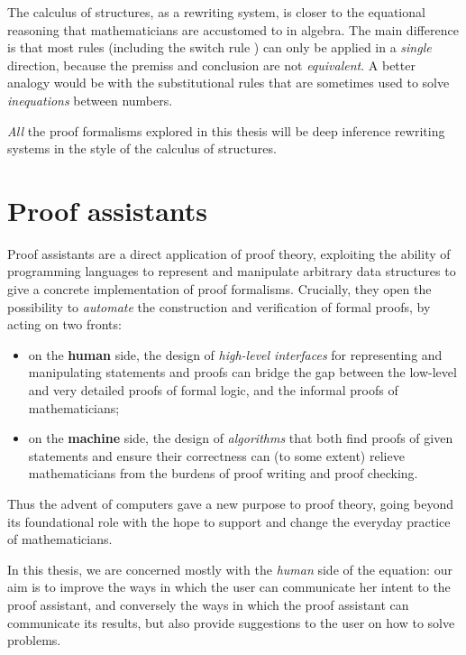 The calculus of structures, as a rewriting system, is closer to the equational
reasoning that mathematicians are accustomed to in algebra. The main difference
is that most rules (including the switch rule ) can only be applied in a
\emph{single} direction, because the premiss and conclusion are not
\emph{equivalent}. A better analogy would be with the substitutional rules that
are sometimes used to solve \emph{inequations} between numbers.

\begin{emphpar}
\emph{All} the proof formalisms explored in this thesis will be deep inference
rewriting systems in the style of the calculus of structures.
\end{emphpar}

\section{Proof assistants}

Proof assistants are a direct application of proof theory, exploiting the
ability of programming languages to represent and manipulate arbitrary data
structures to give a concrete implementation of proof formalisms. Crucially,
they open the possibility to \emph{automate} the construction and verification
of formal proofs, by acting on two fronts:
\begin{itemize}
  \item on the \textbf{human} side, the design of \emph{high-level interfaces}
  for representing and manipulating statements and proofs can bridge the gap
  between the low-level and very detailed proofs of formal logic, and the
  informal proofs of mathematicians;
  \item on the \textbf{machine} side, the design of \emph{algorithms} that both
  find proofs of given statements and ensure their correctness can (to some
  extent) relieve mathematicians from the burdens of proof writing and proof
  checking.
\end{itemize}
Thus the advent of computers gave a new purpose to proof theory, going beyond
its foundational role with the hope to support and change the everyday practice
of mathematicians.

\begin{emphpar}
In this thesis, we are concerned mostly with the \emph{human} side of the
equation: our aim is to improve the ways in which the user can communicate her
intent to the proof assistant, and conversely the ways in which the proof
assistant can communicate its results, but also provide suggestions to the user
on how to solve problems.
\end{emphpar}

